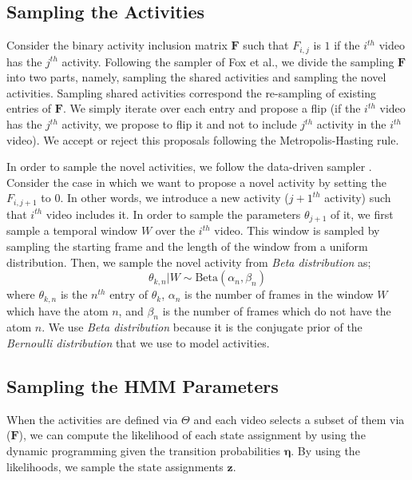 \documentclass[10pt,twocolumn,letterpaper]{article}
\begin{document}
\subsection{Sampling the Activities}
Consider the binary activity inclusion matrix $\mathbf{F}$ such that $F_{i,j}$ is $1$ if the $i^{th}$ video has the $j^{th}$ activity. Following the sampler of Fox et al.\cite{foxBPHMM}, we divide the sampling $\mathbf{F}$ into two parts, namely, sampling the shared activities and sampling the novel activities. Sampling shared activities correspond the re-sampling of existing entries of $\mathbf{F}$. We simply iterate over each entry and propose a flip (\ie if the $i^{th}$ video has the $j^{th}$ activity, we propose to flip it and not to include $j^{th}$ activity in the $i^{th}$ video). We accept or reject this proposals following the Metropolis-Hasting rule.

In order to sample the novel activities, we follow the data-driven sampler \cite{npActivity}. Consider the case in which we want to propose a novel activity by setting the $F_{i,j+1}$ to $0$. In other words, we introduce a new activity ($j+1^{th}$ activity) such that $i^{th}$ video includes it. In order to sample the parameters $\theta_{j+1}$ of it, we first sample a temporal window $W$ over the $i^{th}$ video. This window is sampled by sampling the starting frame and the length of the window from a uniform distribution. Then, we sample the novel activity from \emph{Beta distribution} as;
\begin{equation}
  \theta_{k,n}|W \sim \text{Beta}(\alpha_n,\beta_n)
\end{equation}
where $\theta_{k,n}$ is the $n^{th}$ entry of $\theta_k$, $\alpha_n$ is the number of frames in the window $W$ which have the atom $n$, and $\beta_n$ is the number of frames which do not have the atom $n$. We use \emph{Beta distribution} because it is the conjugate prior of the \emph{Bernoulli distribution} that we use to model activities.

\subsection{Sampling the HMM Parameters}
When the activities are defined via $\Theta$ and each video selects a subset of them via ($\mathbf{F}$), we can compute the likelihood of each state assignment by using the dynamic programming given the transition probabilities $\mathbf{\eta}$. By using the likelihoods, we sample the state assignments $\mathbf{z}$.
\end{document}
